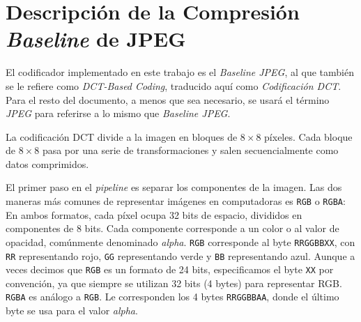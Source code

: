 \section{Descripción de la Compresión \emph{Baseline} de JPEG}

El codificador implementado en este trabajo es el \emph{Baseline JPEG}, al que
también se le refiere como \emph{DCT-Based Coding}, traducido aquí como
\emph{Codificación DCT}. Para el resto del documento, a menos que sea
necesario, se usará el término \emph{JPEG} para referirse a lo mismo que
\emph{Baseline JPEG}.

La codificación DCT divide a la imagen en bloques de $8\times8$ píxeles. Cada
bloque de $8\times8$ pasa por una serie de transformaciones y salen
secuencialmente como datos comprimidos.

El primer paso en el \emph{pipeline} es separar los componentes de la imagen.
Las dos maneras más comunes de representar imágenes en computadoras es
\verb+RGB+ o \verb+RGBA+: En ambos formatos, cada píxel ocupa 32 bits de
espacio, divididos en componentes de 8 bits. Cada componente corresponde a un
color o al valor de opacidad, comúnmente denominado \emph{alpha}. \verb+RGB+
corresponde al byte \verb+RRGGBBXX+, con \verb+RR+ representando rojo,
\verb+GG+ representando verde y \verb+BB+ representando azul. Aunque a veces
decimos que \verb+RGB+ es un formato de 24 bits, especificamos el byte
\verb+XX+ por convención, ya que siempre se utilizan 32 bits (4 bytes) para
representar RGB. \verb+RGBA+ es análogo a \verb+RGB+. Le corresponden los 4
bytes \verb+RRGGBBAA+, donde el último byte se usa para el valor \emph{alpha}.





